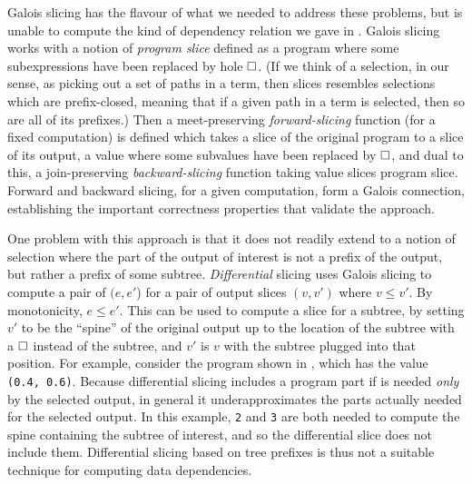 Galois slicing has the flavour of what we needed to address these problems, but is unable to compute the kind of dependency relation we gave in . Galois slicing works with a notion of \emph{program slice} defined as a program where some subexpressions have been replaced by hole $\square$. (If we think of a selection, in our sense, as picking out a set of paths in a term, then slices resembles selections which are prefix-closed, meaning that if a given path in a term is selected, then so are all of its prefixes.) Then a meet-preserving \emph{forward-slicing} function (for a fixed computation) is defined which takes a slice of the original program to a slice of its output, a value where some subvalues have been replaced by $\square$, and dual to this, a join-preserving \emph{backward-slicing} function taking value slices program slice. Forward and backward slicing, for a given computation, form a Galois connection, establishing the important correctness properties that validate the approach.

One problem with this approach is that it does not readily extend to a notion of selection where the part of the output of interest is not a prefix of the output, but rather a prefix of some subtree. \emph{Differential} slicing \cite{perera12a} uses Galois slicing to compute a pair of $(e,e'$) for a pair of output slices $(v,v')$ where $v \leq v'$. By monotonicity, $e \leq e'$. This can be used to compute a slice for a subtree, by setting $v'$ to be the ``spine'' of the original output up to the location of the subtree with a $\square$ instead of the subtree, and $v'$ is $v$ with the subtree plugged into that position. For example, consider the program shown in , which has the value \lstinline{(0.4, 0.6)}. Because differential slicing includes a program part if is needed \emph{only} by the selected output, in general it underapproximates the parts actually needed for the selected output. In this example, \lstinline{2} and \lstinline{3} are both needed to compute the spine containing the subtree of interest, and so the differential slice does not include them. Differential slicing based on tree prefixes is thus not a suitable technique for computing data dependencies.



